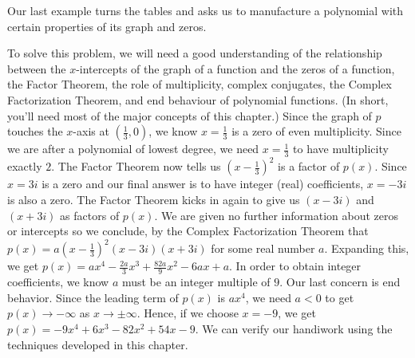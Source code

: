 \medskip

Our last example turns the tables and asks us to manufacture a polynomial with certain properties of its graph and zeros.

\medskip

{
 To solve this problem, we will need a good understanding of the relationship between the $x$-intercepts of the graph of a function and the zeros of a function, the Factor Theorem, the role of multiplicity, complex conjugates, the Complex Factorization Theorem, and end behaviour of polynomial functions.  (In short, you'll need most of the major concepts of this chapter.)  Since the graph of $p$ touches the $x$-axis at $\left(\frac{1}{3}, 0\right)$, we know $x=\frac{1}{3}$ is a zero of even multiplicity.  Since we are after a polynomial of lowest degree, we need $x=\frac{1}{3}$ to have multiplicity exactly $2$. The Factor Theorem now tells us  $\left(x-\frac{1}{3}\right)^2$ is a factor of $p(x)$.  Since $x=3i$ is a zero and our final answer is to have integer (real) coefficients, $x=-3i$ is also a zero.  The Factor Theorem kicks in again to give us $(x-3i)$ and $(x+3i)$ as factors of $p(x)$.  We are given no further information about zeros or intercepts so we conclude, by the Complex Factorization Theorem that $p(x) = a \left(x-\frac{1}{3}\right)^2 (x-3i)(x+3i)$ for some real number $a$.  Expanding this, we get $p(x) =  ax^4-\frac{2a}{3} x^3+\frac{82a}{9} x^2-6ax+a$.  In order to obtain integer coefficients, we know $a$ must be an integer multiple of $9$.  Our last concern is end behavior.  Since the leading term of $p(x)$ is $ax^4$, we need $a < 0$ to get $p(x) \rightarrow -\infty$ as $x \rightarrow \pm \infty$. Hence, if we choose $x=-9$, we get $p(x) = -9x^4+ 6 x^3 - 82 x^2+54x-9$.    We can verify our handiwork using the techniques developed in this chapter.
}


